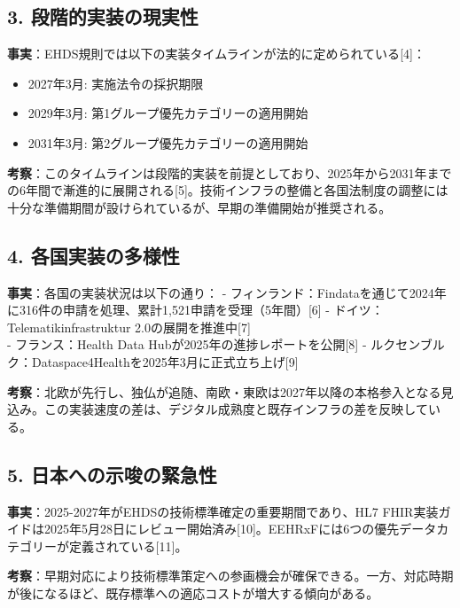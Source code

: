 \documentclass[
  a4paper,
  a4paper,
  11pt]{ltjsbook}
\providecommand{\tightlist}{%
  \setlength{\itemsep}{0pt}\setlength{\parskip}{0pt}}
\begin{document}
\subsection{3.
段階的実装の現実性}\label{ux6bb5ux968eux7684ux5b9fux88c5ux306eux73feux5b9fux6027}

\textbf{事実}：EHDS規則では以下の実装タイムラインが法的に定められている{[}4{]}：

\begin{itemize}
\tightlist
\item
  2027年3月: 実施法令の採択期限
\item
  2029年3月: 第1グループ優先カテゴリーの適用開始
\item
  2031年3月: 第2グループ優先カテゴリーの適用開始
\end{itemize}

\textbf{考察}：このタイムラインは段階的実装を前提としており、2025年から2031年までの6年間で漸進的に展開される{[}5{]}。技術インフラの整備と各国法制度の調整には十分な準備期間が設けられているが、早期の準備開始が推奨される。

\subsection{4.
各国実装の多様性}\label{ux5404ux56fdux5b9fux88c5ux306eux591aux69d8ux6027}

\textbf{事実}：各国の実装状況は以下の通り： -
フィンランド：Findataを通じて2024年に316件の申請を処理、累計1,521申請を受理（5年間）{[}6{]}
- ドイツ：Telematikinfrastruktur 2.0の展開を推進中{[}7{]}\\
- フランス：Health Data Hubが2025年の進捗レポートを公開{[}8{]} -
ルクセンブルク：Dataspace4Healthを2025年3月に正式立ち上げ{[}9{]}

\textbf{考察}：北欧が先行し、独仏が追随、南欧・東欧は2027年以降の本格参入となる見込み。この実装速度の差は、デジタル成熟度と既存インフラの差を反映している。

\subsection{5.
日本への示唆の緊急性}\label{ux65e5ux672cux3078ux306eux793aux5506ux306eux7dcaux6025ux6027}

\textbf{事実}：2025-2027年がEHDSの技術標準確定の重要期間であり、HL7
FHIR実装ガイドは2025年5月28日にレビュー開始済み{[}10{]}。EEHRxFには6つの優先データカテゴリーが定義されている{[}11{]}。

\textbf{考察}：早期対応により技術標準策定への参画機会が確保できる。一方、対応時期が後になるほど、既存標準への適応コストが増大する傾向がある。
\end{document}
